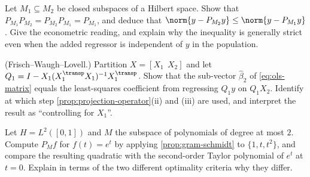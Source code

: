 \begin{exercise}\label{ex:proj-1}
	Let $M_1\subseteq M_2$ be closed subspaces of a Hilbert space. Show that
	$P_{M_1}P_{M_2}=P_{M_2}P_{M_1}=P_{M_1}$, and deduce that
	$\norm{y-P_{M_2}y}\leq\norm{y-P_{M_1}y}$. Give the econometric reading, and
	explain why the inequality is generally strict even when the added regressor is
	independent of $y$ in the population.
\end{exercise}

\begin{exercise}\label{ex:proj-2}
	(Frisch--Waugh--Lovell.) Partition $X=[X_1\ \ X_2]$ and let
	$Q_1=I-X_1(X_1^{\transp}X_1)^{-1}X_1^{\transp}$. Show that the sub-vector
	$\hat\beta_2$ of \eqref{eq:ols-matrix} equals the least-squares coefficient from
	regressing $Q_1y$ on $Q_1X_2$. Identify at which step
	\autoref{prop:projection-operator}(ii) and (iii) are used, and interpret the
	result as ``controlling for $X_1$''.
\end{exercise}

\begin{exercise}\label{ex:proj-3}
	Let $H=L^2([0,1])$ and $M$ the subspace of polynomials of degree at most $2$.
	Compute $P_M f$ for $f(t)=e^t$ by applying \autoref{prop:gram-schmidt} to
	$\{1,t,t^2\}$, and compare the resulting quadratic with the second-order Taylor
	polynomial of $e^t$ at $t=0$. Explain in terms of the two different
	optimality criteria why they differ.
\end{exercise}
